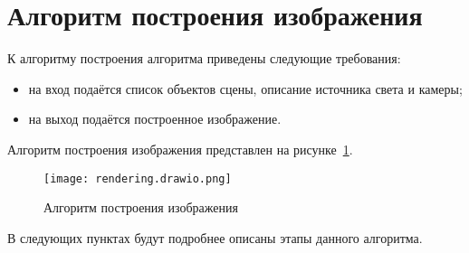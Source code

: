 \section{Алгоритм построения изображения}

К алгоритму построения алгоритма приведены следующие требования:
\begin{itemize}
    \item на вход подаётся список объектов сцены, описание источника света и камеры;
    \item на выход подаётся построенное изображение.
\end{itemize}

Алгоритм построения изображения представлен на рисунке~\ref{fig:rendering}.

\begin{figure}[h!]
    \centering
    \texttt{[image: rendering.drawio.png]}
    \caption{Алгоритм построения изображения}
    \label{fig:rendering}
\end{figure}

В следующих пунктах будут подробнее описаны этапы данного алгоритма.